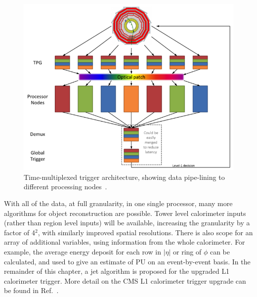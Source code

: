 \begin{figure}[h]
\begin{center}
  \includegraphics[scale=0.8]{Figures/l1jets/TMTrigger.png}

\caption{Time-multiplexed trigger architecture, showing data pipe-lining to different processing nodes~\cite{RoseTrig}. }
\label{fig:TMTrig}
\end{center}
\end{figure}


With all of the data, at full granularity, in one single processor, many more algorithms for object reconstruction are possible. 
Tower level calorimeter inputs (rather than region level inputs) will be available, increasing the granularity by a factor of 4$^{2}$, with similarly improved spatial resolutions.
There is also scope for an array of additional variables, using information from the whole calorimeter. For example, the average energy deposit for each row in $|\eta|$ or ring of $\phi$ can be calculated, and used to give an estimate of \ac{PU} on an event-by-event basis.
In the remainder of this chapter, a jet algorithm is proposed for the upgraded \ac{L1} calorimeter trigger.
More detail on the CMS \ac{L1} calorimeter trigger upgrade can be found in Ref.~\cite{1748-0221-9-01-C01006}.


%        

